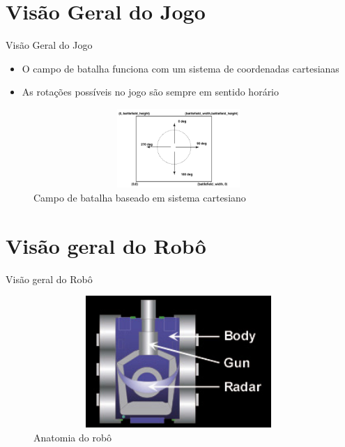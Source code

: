 \section{Visão Geral do Jogo}

\begin{frame}
	\begin{block}{Visão Geral do Jogo}
		\begin{itemize}
			\item O campo de batalha funciona com um sistema de coordenadas cartesianas
			\item As rotações possíveis no jogo são sempre em sentido horário			
		\end{itemize}
		
		\begin{figure}[!htb]
			\centering
			\includegraphics[height=3cm, width = 11cm]{./pic/campoBatalha.png}
			\caption{Campo de batalha baseado em sistema cartesiano  \citep{ROBOWIKI}}
			\label{fig_instalacao03}
		\end{figure}
	\end{block}
\end{frame}


\section{Visão geral do Robô}

\begin{frame}
	\begin{block}{Visão geral do Robô}
		\begin{figure}[!htb]
			\centering	  				
			\includegraphics[height=5cm, width = 11cm]{./pic/Anatomy.jpg}
			\caption{Anatomia do robô  \citep{ROBOWIKI}}
			\label{fig_instalacao04}
		\end{figure}
	\end{block}
\end{frame}



